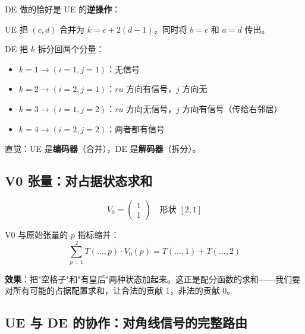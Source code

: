 \documentclass[12pt,a4paper]{article}
\begin{document}
\begin{exbox}
DE 做的恰好是 UE 的\textbf{逆操作}：

UE 把 $(c, d)$ 合并为 $k = c + 2(d-1)$，同时将 $b=c$ 和 $a=d$ 传出。

DE 把 $k$ 拆分回两个分量：
\begin{itemize}
  \item $k=1 \to (i{=}1, j{=}1)$：无信号
  \item $k=2 \to (i{=}2, j{=}1)$：$ru$ 方向有信号，$j$ 方向无
  \item $k=3 \to (i{=}1, j{=}2)$：$ru$ 方向无信号，$j$ 方向有信号（传给右邻居）
  \item $k=4 \to (i{=}2, j{=}2)$：两者都有信号
\end{itemize}

直觉：UE 是\textbf{编码器}（合并），DE 是\textbf{解码器}（拆分）。
\end{exbox}

\subsection{V0 张量：对占据状态求和}

$$V_0 = \begin{pmatrix} 1 \\ 1 \end{pmatrix} \quad \text{形状 } [2, 1]$$

V0 与原始张量的 $p$ 指标缩并：
$$\sum_{p=1}^{2} T(\ldots, p) \cdot V_0(p) = T(\ldots, 1) + T(\ldots, 2)$$

\textbf{效果}：把"空格子"和"有皇后"两种状态加起来。这正是配分函数的求和——我们要对所有可能的占据配置求和，让合法的贡献 1，非法的贡献 0。

\subsection{UE 与 DE 的协作：对角线信号的完整路由}
\end{document}
